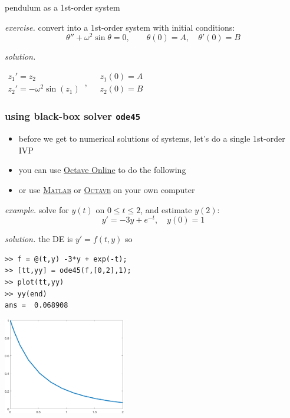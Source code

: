 \documentclass[urlcolor=blue,dvipsnames]{beamer}
\newcommand{\Matlab}{\textsc{Matlab}\xspace}
\newcommand{\Octave}{\textsc{Octave}\xspace}
\begin{document}
\begin{frame}{pendulum as a 1st-order system}

\noindent \emph{exercise.}  convert into a 1st-order system with initial conditions:
    $$\theta''+ \omega^2 \sin\theta = 0, \qquad \theta(0)=A, \quad \theta'(0)=B$$

\noindent \emph{solution.}  

\vspace{30mm}

\hfill $\displaystyle \boxed{\begin{matrix} z_1' = z_2 \phantom{sdfldfs} \\ z_2' = - \omega^2 \sin(z_1)\end{matrix}\,, \quad \begin{matrix}z_1(0)=A \\ z_2(0)=B\end{matrix}}$
\end{frame}


\begin{frame}[fragile]
\frametitle{using black-box solver \texttt{ode45}}

\begin{itemize}
\item before we get to numerical solutions of systems, let's do a single 1st-order IVP
\item you can use \href{https://octave-online.net/}{Octave Online} to do the following
\item or use \href{https://www.mathworks.com/products/matlab.html}{\Matlab} or \href{https://www.gnu.org/software/octave/}{\Octave} on your own computer
\end{itemize}

\noindent \emph{example.}  solve for $y(t)$ on $0 \le t \le 2$, and estimate $y(2)$:
    $$y' = - 3 y + e^{-t}, \quad y(0)=1$$

\noindent \emph{solution.} the DE is $y'=f(t,y)$ so

\begin{Verbatim}
>> f = @(t,y) -3*y + exp(-t);
>> [tt,yy] = ode45(f,[0,2],1);
>> plot(tt,yy)
>> yy(end)
ans =  0.068908
\end{Verbatim}

\vspace{-25mm}
\hfill \includegraphics[width=0.4\textwidth]{figs/ode45out}
\end{frame}
\end{document}
